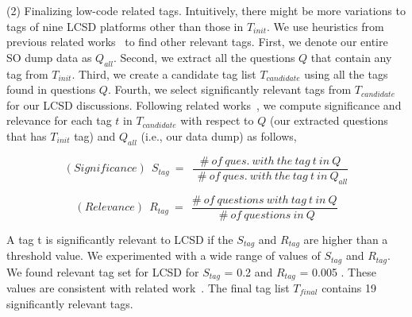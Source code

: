 (2) Finalizing low-code related tags.
Intuitively, there might be more variations to tags of nine  LCSD platforms other than those in $T_{init}$. We use heuristics from previous related works~\cite{bagherzadeh2019going, yang2016security} to find other relevant tags. First, we denote our entire SO dump data as $Q_{all}$. Second, we extract all the questions $Q$ that contain any tag from $T_{init}$. Third, we create a candidate tag list $T_{candidate}$ using all the tags found in questions $Q$. Fourth, we select significantly relevant tags from  $T_{candidate}$ for our  LCSD discussions. Following related works~\cite{bagherzadeh2019going, yang2016security}, we compute significance and relevance for each tag $t$ in $T_{candidate}$ with respect to $Q$ (our extracted questions that has $T_{init}$ tag) and $Q_{all}$ (i.e., our data dump) as follows,
{ \[
( Significance) \ \ S_{tag} \ =\ \ \frac{\#\ of\ ques.\ with\ the\ tag\ t\ in\ Q}{\ \ \#\ of\ ques.\ with\ the\ tag\ t\ in\ Q_{all}}
\]

\[
( Relevance) \ \ R_{tag} \ =\ \ \frac{\#\ of\ questions\ with\ tag\ t\ in\ Q}{\ \ \#\ of\ questions\ in\ Q}
\]} A tag t is significantly relevant to  LCSD if the $S_{tag}$ and  $R_{tag}$ are higher than a threshold value. We experimented with a wide range of values of $S_{tag}$ and  $R_{tag}$. We found relevant tag set for  LCSD for $S_{tag}$ = 0.2 and $R_{tag}$ = 0.005 . These values are consistent with related work~\cite{bagherzadeh2019going,ahmed2018concurrency}. The final tag list $T_{final}$ contains 19 significantly relevant tags. 


